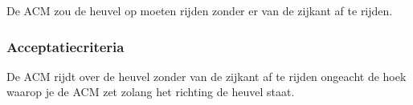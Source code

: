 \begin{flushleft}
    De ACM zou de heuvel op moeten rijden zonder er van de zijkant af te rijden.
\end{flushleft}

\subsubsection{Acceptatiecriteria}
\begin{flushleft}
    De ACM rijdt over de heuvel zonder van de zijkant af te rijden ongeacht de hoek waarop je de ACM zet zolang het richting de heuvel staat.
\end{flushleft}
